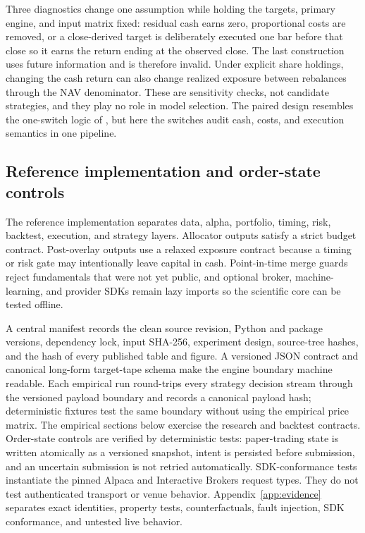 \documentclass{article}
\begin{document}
Three diagnostics change one assumption while holding the targets, primary
engine, and input matrix fixed: residual cash earns zero, proportional costs
are removed, or a close-derived target is deliberately executed one bar before
that close so it earns the return ending at the observed close. The last
construction uses future information and is therefore invalid. Under explicit
share holdings, changing the cash return can also change realized exposure
between rebalances through the NAV denominator. These are sensitivity checks,
not candidate strategies, and they play no role in model selection. The paired
design resembles the one-switch logic of \citet{zhang2026alpha}, but here the
switches audit cash, costs, and execution semantics in one pipeline.

\subsection{Reference implementation and order-state controls}

The reference implementation separates data, alpha, portfolio, timing, risk,
backtest, execution, and strategy layers. Allocator outputs satisfy a strict
budget contract. Post-overlay outputs use a relaxed exposure contract because
a timing or risk gate may intentionally leave capital in cash. Point-in-time
merge guards reject fundamentals that were not yet public, and optional broker,
machine-learning, and provider SDKs remain lazy imports so the scientific core
can be tested offline.

A central manifest records the clean source revision, Python and package
versions, dependency lock, input SHA-256, experiment design, source-tree hashes,
and the hash of every published table and figure. A versioned JSON contract and
canonical long-form target-tape schema make the engine boundary machine
readable. Each empirical run round-trips every strategy decision stream
through the versioned payload boundary and records a canonical payload hash;
deterministic fixtures test the same boundary without using the empirical price
matrix. The empirical sections below exercise the
research and backtest contracts. Order-state controls are verified by
deterministic tests: paper-trading state is written atomically as a versioned
snapshot, intent is persisted before submission, and an uncertain submission
is not retried automatically. SDK-conformance tests instantiate the pinned
Alpaca and Interactive Brokers request types. They do not test authenticated
transport or venue behavior. Appendix~\ref{app:evidence} separates exact
identities, property tests, counterfactuals, fault injection, SDK conformance,
and untested live behavior.
\end{document}
